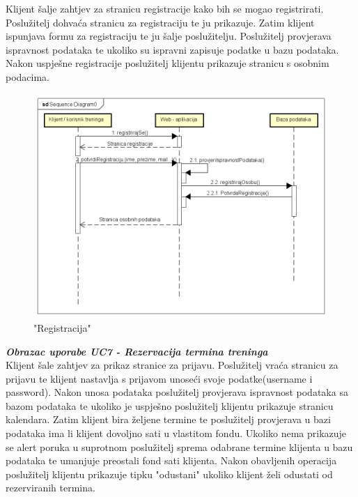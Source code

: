 				{Klijent šalje zahtjev za stranicu registracije kako bih se mogao registrirati. Poslužitelj dohvaća stranicu za registraciju te ju prikazuje. Zatim klijent ispunjava formu za registraciju te ju šalje poslužitelju. Poslužitelj provjerava ispravnost podataka te ukoliko su ispravni zapisuje podatke u bazu podataka. Nakon uspješne registracije poslužitelj klijentu prikazuje stranicu s osobnim podacima.
					
				
				\begin{figure}[H]
					\includegraphics[scale=0.6]{dijagrami/sekvencijskiVukelic.png} %
					\centering
					\caption{"Registracija"}
					\label{fig:sekvencijski1}
				\end{figure}
			
				\eject
				
				\textbf{\textit{Obrazac uporabe UC7 - Rezervacija termina treninga}}\\
				
			
				{Klijent šale zahtjev za prikaz stranice za prijavu. Poslužitelj vraća stranicu za prijavu te klijent nastavlja s prijavom unoseći svoje podatke(username i password). Nakon unosa podataka poslužitelj provjerava ispravnost podataka sa bazom podataka te ukoliko je uspješno poslužitelj klijentu prikazuje stranicu kalendara. Zatim klijent bira željene termine te poslužitelj provjerava u bazi podataka ima li klijent dovoljno sati u vlastitom fondu. Ukoliko nema prikazuje se alert poruka u suprotnom poslužitelj sprema odabrane termine klijenta u bazu podataka te umanjuje preostali fond sati klijenta. Nakon obavljenih operacija poslužitelj klijentu prikazuje tipku "odustani" ukoliko klijent želi odustati od rezerviranih termina.}
				
}
